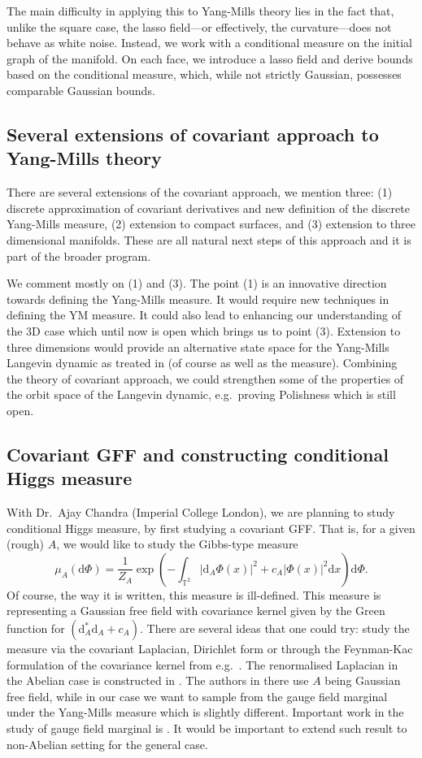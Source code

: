 \documentclass[11pt]{article}
\numberwithin{equation}{section}
\theoremstyle{definition}
\theoremstyle{remark}
\newcommand{\diff}{\mathrm{d}}
\newcommand{\1}{\mathbf 1}
\newcommand{\<}{\langle}
\renewcommand{\>}{\rangle}
\newcommand{\bT}{\mathbb T}
\begin{document}
The main difficulty in applying this to Yang-Mills theory lies in the fact that, unlike the square case, the lasso field—or effectively, the curvature—does not behave as white noise. Instead, we work with a conditional measure on the initial graph of the manifold. On each face, we introduce a lasso field and derive bounds based on the conditional measure, which, while not strictly Gaussian, possesses comparable Gaussian bounds.
%
\subsection{Several extensions of covariant approach to Yang-Mills theory}\label{sec:ext_Dirac}
%
There are several extensions of the covariant approach, we mention three: (1) discrete approximation of covariant derivatives and new definition of the discrete Yang-Mills measure, (2) extension to compact surfaces, and (3) extension to three dimensional manifolds.  These are all natural next steps of this approach and it is part of the broader program. 

We comment mostly on (1) and (3). The point (1) is an innovative direction towards defining the Yang-Mills measure. It would require new techniques in defining the YM measure. It could also lead to enhancing our understanding of the 3D case which until now is open which brings us to point (3). Extension to three dimensions would provide an alternative state space for the Yang-Mills Langevin dynamic as treated in \cite{CCHS3d} (of course as well as the measure). Combining the theory of covariant approach, we could strengthen some of the properties of the orbit space of the Langevin dynamic, e.g.\ proving Polishness which is still open.   


\subsection{Covariant GFF and constructing conditional Higgs measure}
With Dr.\ Ajay Chandra (Imperial College London), we are planning to study conditional Higgs measure, by first studying a covariant GFF. That is, for a given (rough) $A$, we would like to study the Gibbs-type measure
\[
\mu_A(\diff\Phi)=\frac 1 {Z_A} \exp\left( -\int_{\bT^2}|\diff_A\Phi(x)|^2+c_A|\Phi(x)|^2\diff x\right)\diff\Phi. 
\]
Of course, the way it is written, this measure is ill-defined. This measure is representing a Gaussian free field with covariance kernel given by the Green function for $(\diff_A^*\diff_A+c_A)$. There are several ideas that one could try: study the measure via the covariant Laplacian, Dirichlet form or through the Feynman-Kac formulation of the covariance kernel from e.g.\ \cite{SP24}. The renormalised Laplacian in the Abelian case is constructed in \cite{MM22}. The authors in there use $A$ being Gaussian free field, while in our case we want to sample from the gauge field marginal under the Yang-Mills measure which is slightly different. Important work in the study of gauge field marginal is \cite{CC24}. It would be important to extend such result to non-Abelian setting for the general case.   
\end{document}
